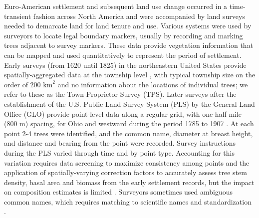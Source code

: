 \documentclass[12pt]{article}\usepackage[]{graphicx}\usepackage[]{color}
\begin{document}
Euro-American settlement and subsequent land use change occurred in
a time-transient fashion across North America and were accompanied
by land surveys needed to demarcate land for land tenure and use.
Various systems were used by surveyors to locate legal boundary markers,
usually by recording and marking trees adjacent to survey markers.
These data provide vegetation information that can be mapped and used
quantitatively to represent the period of settlement. Early surveys
(from 1620 until 1825) in the northeastern United States provide spatially-aggregated
data at the township level \citep{Cogb:etal:2002,thompson2013four},
with typical township size on the order of 200 $\mbox{km}^{2}$ and
no information about the locations of individual trees; we refer to
these as the Town Proprietor Survey (TPS). Later surveys after the
establishment of the U.S. Public Land Survey System (PLS) by the General
Land Office (GLO) provide point-level data along a regular grid, with
one-half mile (800 m) spacing, for Ohio and westward during the period
1785 to 1907 \citep{bourdo1956review,pattison1957beginnings,schulte2001original,goring2015composition}.
At each point 2-4 trees were identified, and the common name, diameter
at breast height, and distance and bearing from the point were recorded.
Survey instructions during the PLS varied through time and by point
type. Accounting for this variation requires data screening to maximize
consistency among points and the application of spatially-varying
correction factors \citet{goring2015composition} to accurately assess
tree stem density, basal area and biomass from the early settlement
records, but the impact on composition estimates is limited \citep{liu2011broadscale}.
Surveyors sometimes used ambiguous common names, which requires matching
to scientific names and standardization \citep{mladenoff2002narrowing,goring2015composition}.
\end{document}
